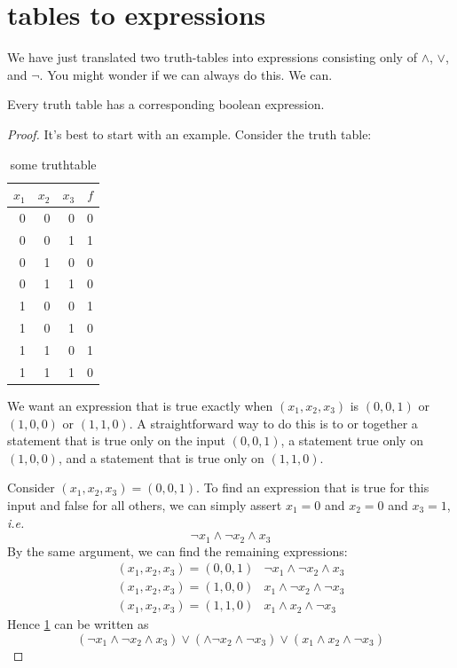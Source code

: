 \documentclass{scrbook}
\begin{document}
\section[Tables to Expressions]{tables to expressions}
We have just translated two truth-tables into expressions consisting only of $\wedge$, $\vee$, and $\neg$. You might wonder if we can always do this. We can. 
\begin{theorem}[completeness]
  Every truth table has a corresponding boolean expression.
\end{theorem}
\begin{proof}
  It's best to start with an example. Consider the truth table:
  \begin{table}
    \centering
  \caption{some truthtable}\label{tt:complete}
\begin{tabular}{rrrr}
$x_1$ & $x_2$ & $x_3$ & $f$ \\
\hline
0 & 0 & 0 & 0 \\
\rowcolor{LightCyan} 0 & 0 & 1 & 1 \\
0 & 1 & 0 & 0 \\
0 & 1 & 1 & 0 \\
\rowcolor{LightCyan} 1 & 0 & 0 & 1 \\
1 & 0 & 1 & 0 \\
\rowcolor{LightCyan} 1 & 1 & 0 & 1 \\
1 & 1 & 1 & 0 
\end{tabular}
\end{table}
We want an expression that is true exactly when $(x_1,x_2,x_3)$ is $(0,0,1)$ or $(1,0,0)$ or $(1,1,0)$. A straightforward way to do this is to or together a statement that is true only on the input $(0,0,1)$, a statement true only on $(1,0,0)$, and a statement that is true only on $(1,1,0)$. 

Consider $(x_1,x_2,x_3)=(0,0,1)$. To find an expression that is true for this input and false for all others, we can simply assert $x_1=0$ and $x_2=0$ and $x_3=1$, \emph{i.e.}
\[
\neg x_1\wedge \neg x_2 \wedge x_3
\]
By the same argument, we can find the remaining expressions:
\[
\begin{matrix}
 (x_1,x_2,x_3)=(0,0,1) & \neg x_1 \wedge \neg x_2 \wedge x_3 \\
 (x_1,x_2,x_3)=(1,0,0) & x_1 \wedge \neg x_2 \wedge \neg x_3 \\
 (x_1,x_2,x_3)=(1,1,0) & x_1 \wedge x_2 \wedge \neg x_3 
\end{matrix}
\]
Hence \cref{tt:complete} can be written as 
\[
(\neg x_1 \wedge \neg x_2 \wedge x_3 ) \vee (\wedge \neg x_2 \wedge \neg x_3) \vee  (x_1 \wedge x_2 \wedge \neg x_3)
\]


\end{proof}
\end{document}
